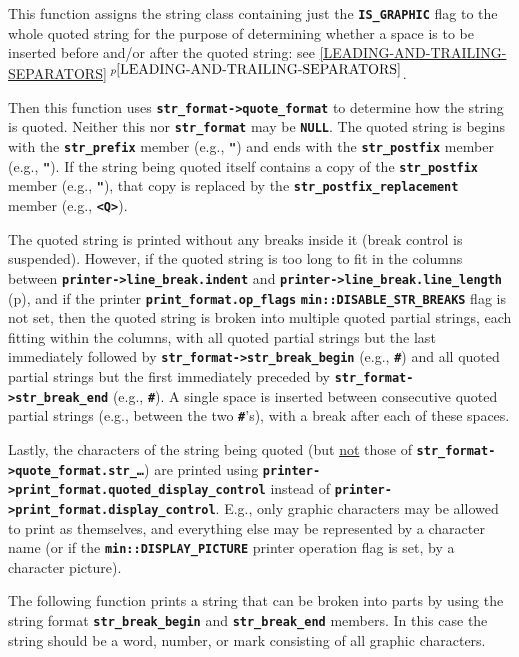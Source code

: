 \documentclass[12pt]{article}
\newcommand{\TT}[1]{{\tt \bfseries #1}}
\newcommand{\itemref}[1]{\ref{#1}$\,^{p\pageref{#1}}$}
\newcommand{\pagref}[1]{p\pageref{#1}}
\newcommand{\EOL}{\penalty \exhyphenpenalty}
\begin{document}
This function assigns the string class containing just
the \TT{IS\_\EOL GRAPHIC} flag to the whole quoted string
for the purpose of determining whether a space is to be inserted
before and/or after
the quoted string: see \itemref{LEADING-AND-TRAILING-SEPARATORS}.

Then this function uses \TT{str\_format->quote\_format}
to determine how the string is quoted.  Neither this nor
\TT{str\_\EOL format} may be \TT{NULL}.
The quoted string is begins
with the \TT{str\_\EOL prefix} member (e.g., \TT{"}) and ends with the
\TT{str\_\EOL postfix} member (e.g., \TT{"}).  If the string being
quoted itself
contains a copy of the \TT{str\_\EOL postfix} member (e.g., \TT{"}),
that copy is replaced by the \TT{str\_\EOL postfix\_\EOL replacement}
member (e.g., \TT{<Q>}).

The quoted string is printed without any breaks inside it (break
control is suspended).  However, if
the quoted string is too long to fit in the
columns between \TT{printer->\EOL line\_\EOL break.indent}
and \TT{printer->\EOL line\_\EOL break.line\_\EOL length}
(\pagref{LINE-LENGTH}), and if the printer
\TT{print\_\EOL format.op\_\EOL flags}
\TT{min::\EOL DISABLE\_\EOL STR\_\EOL BREAKS} flag is not set, then
the quoted string is broken into multiple quoted partial strings, each
fitting within the columns, with all quoted partial strings but the
last immediately followed by
\TT{str\_\EOL format->\EOL str\_\EOL break\_\EOL begin}
(e.g., \TT{\#})
and all quoted partial strings but the first immediately preceded by
\TT{str\_\EOL format->\EOL str\_\EOL break\_\EOL end}
(e.g., \TT{\#}).
A single space is inserted between consecutive
quoted partial strings (e.g., between the two \TT{\#}'s),
with a break after each of these spaces.

Lastly, the characters of the string being quoted (but \underline{not}
those of \TT{str\_\EOL format->\EOL quote\_\EOL format.str\_\ldots})
are printed using
\TT{printer->\EOL print\_format.quoted\_\EOL display\_\EOL control}
instead of \TT{printer->\EOL print\_\EOL format.display\_\EOL control}.
E.g., only graphic characters may be allowed to print as themselves,
and everything else may be represented by a character name
(or if the \TT{min::\EOL DISPLAY\_\EOL PICTURE} printer operation
flag is set, by a character picture).

The following function prints a string that can be broken into
parts by using the string format \TT{str\_\EOL break\_\EOL begin}
and \TT{str\_\EOL break\_\EOL end} members.  In this case the
string should be a word, number, or mark consisting of all graphic
characters.
\end{document}
